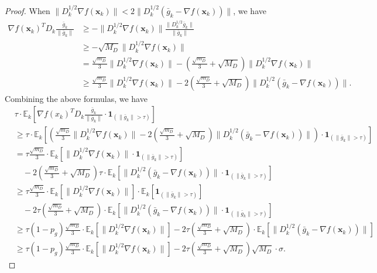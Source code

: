 \documentclass{article}
\newcommand{\bx}{\boldsymbol{x}}
\newcommand{\barg}{\bar{g}}
\theoremstyle{plain}
\theoremstyle{definition}
\theoremstyle{remark}
\begin{document}
\begin{proof}
When $\|D_k^{1/2}\nabla f(\bx_k)\|<2\|D_k^{1/2}(\barg_k-\nabla f(\bx_k))\|$, we have
\begin{align*}
    \nabla f(\bx_k)^TD_k\frac{\barg_k}{\|\barg_k\|} & \geq - \| D_k^{1/2}\nabla f(\bx_k)\| \frac{\| D_k^{1/2}\barg_k\|}{\|\barg_k\|}\\
   & \geq - \sqrt{M_D}\| D_k^{1/2}\nabla f(\bx_k)\|\\
   & =  \frac{\sqrt{m_D}}{3}\| D_k^{1/2}\nabla f(\bx_k)\| - \left( \frac{\sqrt{m_D}}{3} + \sqrt{M_D}\right)\| D_k^{1/2}\nabla f(\bx_k)\| \\
   & \geq \frac{\sqrt{m_D}}{3}\| D_k^{1/2}\nabla f(\bx_k)\| - 2\left( \frac{\sqrt{m_D}}{3} + \sqrt{M_D}\right)\| D_k^{1/2}(\barg_k-\nabla f(\bx_k))\|.
\end{align*}
Combining the above formulas, we have
\begin{align*}
   & \tau \cdot \mathbb{E}_k\left[\nabla f(x_k)^T D_k \frac{\bar{g}_k}{\|\bar{g}_k\|} \cdot \boldsymbol{1}_{(\|\bar{g}_k\| > \tau)} \right] \\
   & \geq  
   \tau \cdot \mathbb{E}_k\left[\left(\frac{\sqrt{m_D}}{3}\| D_k^{1/2}\nabla f(\bx_k)\| - 2\left( \frac{\sqrt{m_D}}{3} + \sqrt{M_D}\right)\| D_k^{1/2}(\barg_k-\nabla f(\bx_k))\|\right) \cdot \boldsymbol{1}_{(\|\bar{g}_k\| > \tau)} \right] \\
   & = \tau \frac{\sqrt{m_D}}{3} \cdot \mathbb{E}_k\left[\| D_k^{1/2}\nabla f(\bx_k)\| \cdot \boldsymbol{1}_{(\|\bar{g}_k\| > \tau)} \right]  \\
   & \quad - 2\left( \frac{\sqrt{m_D}}{3} + \sqrt{M_D}\right) \tau \cdot \mathbb{E}_k\left[ \| D_k^{1/2}(\barg_k-\nabla f(\bx_k))\|\cdot \boldsymbol{1}_{(\|\bar{g}_k\| > \tau) } \right] \\
   & \geq \tau \frac{\sqrt{m_D}}{3} \cdot \mathbb{E}_k\left[\| D_k^{1/2}\nabla f(\bx_k)\|\right] \cdot \mathbb{E}_k\left[\boldsymbol{1}_{(\|\bar{g}_k\| > \tau) }\right]  \\
   & \quad - 2\tau \left( \frac{\sqrt{m_D}}{3} + \sqrt{M_D}\right)  \cdot \mathbb{E}_k\left[ \| D_k^{1/2}(\barg_k-\nabla f(\bx_k))\|\cdot \boldsymbol{1}_{(\|\bar{g}_k\| > \tau)} \right] \\
   & \geq \tau (1-p_g) \frac{\sqrt{m_D}}{3} \cdot \mathbb{E}_k\left[\| D_k^{1/2}\nabla f(\bx_k)\|\right]  - 2\tau \left( \frac{\sqrt{m_D}}{3} + \sqrt{M_D}\right)  \cdot \mathbb{E}_k\left[ \| D_k^{1/2}(\barg_k-\nabla f(\bx_k))\|  \right] \\
   & \geq \tau (1-p_g) \frac{\sqrt{m_D}}{3} \cdot \mathbb{E}_k\left[\| D_k^{1/2}\nabla f(\bx_k)\|\right]  - 2\tau \left( \frac{\sqrt{m_D}}{3} + \sqrt{M_D}\right) \sqrt{M_D} \cdot \sigma .
\end{align*}


\end{proof}
\end{document}
